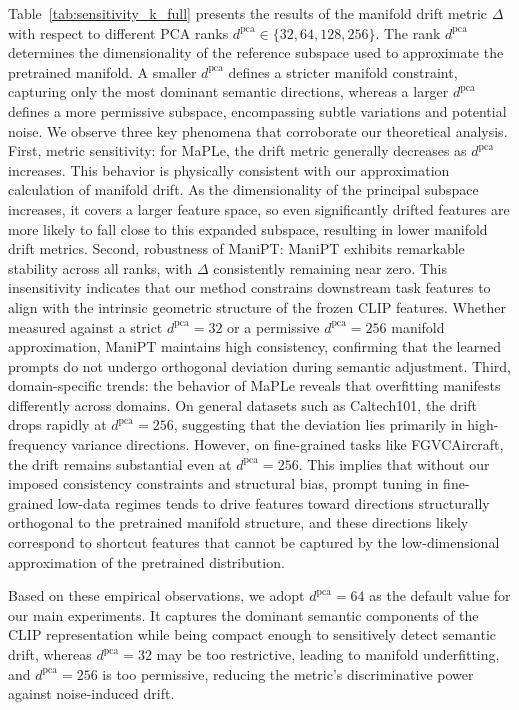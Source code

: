\documentclass{article}
\theoremstyle{plain}
\theoremstyle{definition}
\theoremstyle{remark}
\begin{document}
	Table~\ref{tab:sensitivity_k_full} presents the results of the manifold drift metric $\Delta$ with respect to different PCA ranks $d^{\mathrm{pca}} \in \{32, 64, 128, 256\}$. The rank $d^{\mathrm{pca}}$ determines the dimensionality of the reference subspace used to approximate the pretrained manifold. A smaller $d^{\mathrm{pca}}$ defines a stricter manifold constraint, capturing only the most dominant semantic directions, whereas a larger $d^{\mathrm{pca}}$ defines a more permissive subspace, encompassing subtle variations and potential noise. We observe three key phenomena that corroborate our theoretical analysis. First, metric sensitivity: for MaPLe, the drift metric generally decreases as $d^{\mathrm{pca}}$ increases. This behavior is physically consistent with our approximation calculation of manifold drift. As the dimensionality of the principal subspace increases, it covers a larger feature space, so even significantly drifted features are more likely to fall close to this expanded subspace, resulting in lower manifold drift metrics. Second, robustness of ManiPT: ManiPT exhibits remarkable stability across all ranks, with $\Delta$ consistently remaining near zero. This insensitivity indicates that our method constrains downstream task features to align with the intrinsic geometric structure of the frozen CLIP features. Whether measured against a strict $d^{\mathrm{pca}}=32$ or a permissive $d^{\mathrm{pca}}=256$ manifold approximation, ManiPT maintains high consistency, confirming that the learned prompts do not undergo orthogonal deviation during semantic adjustment. Third, domain-specific trends: the behavior of MaPLe reveals that overfitting manifests differently across domains. On general datasets such as Caltech101, the drift drops rapidly at $d^{\mathrm{pca}}=256$, suggesting that the deviation lies primarily in high-frequency variance directions. However, on fine-grained tasks like FGVCAircraft, the drift remains substantial even at $d^{\mathrm{pca}}=256$. This implies that without our imposed consistency constraints and structural bias, prompt tuning in fine-grained low-data regimes tends to drive features toward directions structurally orthogonal to the pretrained manifold structure, and these directions likely correspond to shortcut features that cannot be captured by the low-dimensional approximation of the pretrained distribution. 
	
	Based on these empirical observations, we adopt $d^{\mathrm{pca}}=64$ as the default value for our main experiments. It captures the dominant semantic components of the CLIP representation while being compact enough to sensitively detect semantic drift, whereas $d^{\mathrm{pca}}=32$ may be too restrictive, leading to manifold underfitting, and $d^{\mathrm{pca}}=256$ is too permissive, reducing the metric's discriminative power against noise-induced drift.
\end{document}
